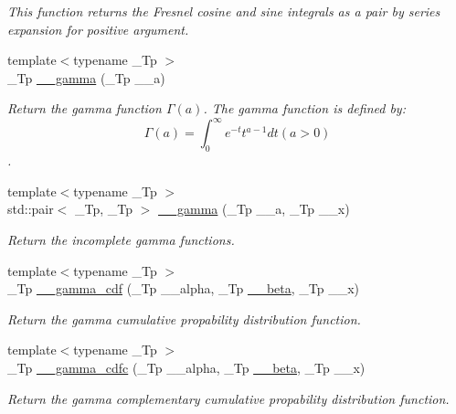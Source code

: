 \begin{DoxyCompactItemize}
\begin{DoxyCompactList}\small\item\em This function returns the Fresnel cosine and sine integrals as a pair by series expansion for positive argument. \end{DoxyCompactList}\item 
{\footnotesize template$<$typename \+\_\+\+Tp $>$ }\\\+\_\+\+Tp \hyperlink{namespacestd_1_1____detail_a178e0b2cc0ae66b7d958e837da4fe4c1}{\+\_\+\+\_\+gamma} (\+\_\+\+Tp \+\_\+\+\_\+a)
\begin{DoxyCompactList}\small\item\em Return the gamma function $ \Gamma(a) $. The gamma function is defined by\+: \[ \Gamma(a) = \int_0^\infty e^{-t}t^{a-1}dt (a > 0) \]. \end{DoxyCompactList}\item 
{\footnotesize template$<$typename \+\_\+\+Tp $>$ }\\std\+::pair$<$ \+\_\+\+Tp, \+\_\+\+Tp $>$ \hyperlink{namespacestd_1_1____detail_a00ade496acee116fb7990d20ff4be762}{\+\_\+\+\_\+gamma} (\+\_\+\+Tp \+\_\+\+\_\+a, \+\_\+\+Tp \+\_\+\+\_\+x)
\begin{DoxyCompactList}\small\item\em Return the incomplete gamma functions. \end{DoxyCompactList}\item 
{\footnotesize template$<$typename \+\_\+\+Tp $>$ }\\\+\_\+\+Tp \hyperlink{namespacestd_1_1____detail_aa4f1cd082a56f66b7ac2f8d805f66a81}{\+\_\+\+\_\+gamma\+\_\+cdf} (\+\_\+\+Tp \+\_\+\+\_\+alpha, \+\_\+\+Tp \hyperlink{namespacestd_1_1____detail_a090d2f0920e0d208c467609b2a81d717}{\+\_\+\+\_\+beta}, \+\_\+\+Tp \+\_\+\+\_\+x)
\begin{DoxyCompactList}\small\item\em Return the gamma cumulative propability distribution function. \end{DoxyCompactList}\item 
{\footnotesize template$<$typename \+\_\+\+Tp $>$ }\\\+\_\+\+Tp \hyperlink{namespacestd_1_1____detail_a7dc59114c8c223b5570c374a7192d404}{\+\_\+\+\_\+gamma\+\_\+cdfc} (\+\_\+\+Tp \+\_\+\+\_\+alpha, \+\_\+\+Tp \hyperlink{namespacestd_1_1____detail_a090d2f0920e0d208c467609b2a81d717}{\+\_\+\+\_\+beta}, \+\_\+\+Tp \+\_\+\+\_\+x)
\begin{DoxyCompactList}\small\item\em Return the gamma complementary cumulative propability distribution function. \end{DoxyCompactList}\item 

\end{DoxyCompactItemize}
